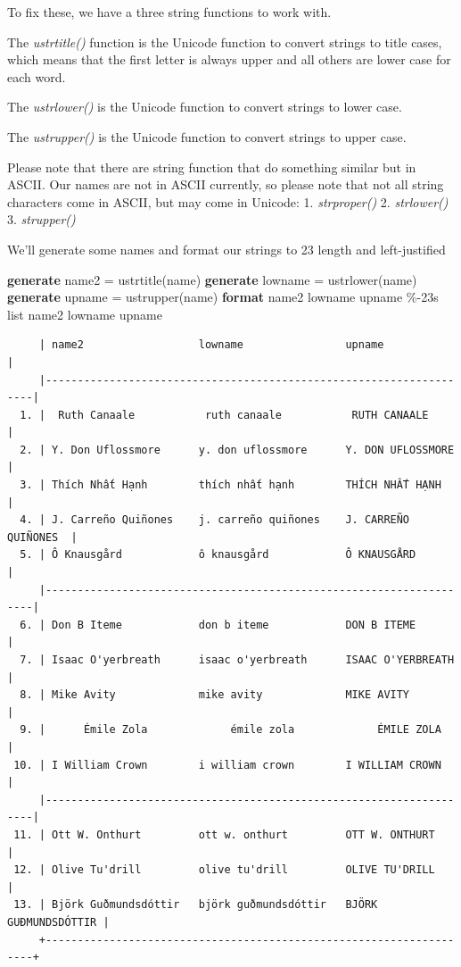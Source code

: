 \documentclass[
]{book}
\newenvironment{Shaded}{\begin{snugshade}}{\end{snugshade}}
\newcommand{\BaseNTok}[1]{\textcolor[rgb]{0.00,0.00,0.81}{#1}}
\newcommand{\KeywordTok}[1]{\textcolor[rgb]{0.13,0.29,0.53}{\textbf{#1}}}
\newcommand{\NormalTok}[1]{#1}
\newcommand{\OtherTok}[1]{\textcolor[rgb]{0.56,0.35,0.01}{#1}}
\begin{document}
To fix these, we have a three string functions to work with.

The \emph{ustrtitle()} function is the Unicode function to convert strings to title cases, which means that the first letter is always upper and all others are lower case for each word.

The \emph{ustrlower()} is the Unicode function to convert strings to lower case.

The \emph{ustrupper()} is the Unicode function to convert strings to upper case.

Please note that there are string function that do something similar but in ASCII. Our names are not in ASCII currently, so please note that not all string characters come in ASCII, but may come in Unicode:
1. \emph{strproper()}
2. \emph{strlower()}
3. \emph{strupper()}

We'll generate some names and format our strings to 23 length and left-justified

\begin{Shaded}
\begin{Highlighting}[]
\KeywordTok{generate}\NormalTok{ name2 = ustrtitle(}\BaseNTok{name}\NormalTok{)}
\KeywordTok{generate}\NormalTok{ lowname = ustrlower(}\BaseNTok{name}\NormalTok{)}
\KeywordTok{generate}\NormalTok{ upname = ustrupper(}\BaseNTok{name}\NormalTok{)}
\KeywordTok{format}\NormalTok{ name2 lowname upname \%{-}23s}
\OtherTok{list}\NormalTok{ name2 lowname upname}
\end{Highlighting}
\end{Shaded}

\begin{verbatim}
     | name2                  lowname                upname               |
     |--------------------------------------------------------------------|
  1. |  Ruth Canaale           ruth canaale           RUTH CANAALE        |
  2. | Y. Don Uflossmore      y. don uflossmore      Y. DON UFLOSSMORE    |
  3. | Thích Nhất Hạnh        thích nhất hạnh        THÍCH NHẤT HẠNH      |
  4. | J. Carreño Quiñones    j. carreño quiñones    J. CARREÑO QUIÑONES  |
  5. | Ô Knausgård            ô knausgård            Ô KNAUSGÅRD          |
     |--------------------------------------------------------------------|
  6. | Don B Iteme            don b iteme            DON B ITEME          |
  7. | Isaac O'yerbreath      isaac o'yerbreath      ISAAC O'YERBREATH    |
  8. | Mike Avity             mike avity             MIKE AVITY           |
  9. |      Émile Zola             émile zola             ÉMILE ZOLA      |
 10. | I William Crown        i william crown        I WILLIAM CROWN      |
     |--------------------------------------------------------------------|
 11. | Ott W. Onthurt         ott w. onthurt         OTT W. ONTHURT       |
 12. | Olive Tu'drill         olive tu'drill         OLIVE TU'DRILL       |
 13. | Björk Guðmundsdóttir   björk guðmundsdóttir   BJÖRK GUÐMUNDSDÓTTIR |
     +--------------------------------------------------------------------+
\end{verbatim}
\end{document}
